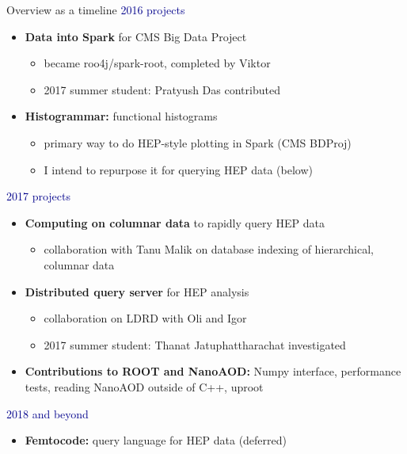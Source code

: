 \documentclass{beamer}
\begin{document}
\begin{frame}{Overview as a timeline}
\vspace{0.25 cm}
\textcolor{darkblue}{2016 projects}
\begin{itemize}
\item {\bf Data into Spark} for CMS Big Data Project
\begin{itemize}
\item became roo4j/spark-root, completed by Viktor
\item 2017 summer student: Pratyush Das contributed
\end{itemize}

\item {\bf Histogrammar:} functional histograms
\begin{itemize}
\item primary way to do HEP-style plotting in Spark (CMS BDProj)
\item I intend to repurpose it for querying HEP data (below)
\end{itemize}
\end{itemize}

\textcolor{darkblue}{2017 projects}
\begin{itemize}
\item {\bf Computing on columnar data} to rapidly query HEP data
\begin{itemize}
\item collaboration with Tanu Malik on database indexing of hierarchical, columnar data
\end{itemize}

\item {\bf Distributed query server} for HEP analysis
\begin{itemize}
\item collaboration on LDRD with Oli and Igor
\item 2017 summer student: Thanat Jatuphattharachat investigated
\end{itemize}

\item {\bf Contributions to ROOT and NanoAOD:} Numpy interface, performance tests, reading NanoAOD outside of C++, uproot
\end{itemize}

\textcolor{darkblue}{2018 and beyond}
\begin{itemize}
\item {\bf Femtocode:} query language for HEP data (deferred)
\end{itemize}
\end{frame}
\end{document}
